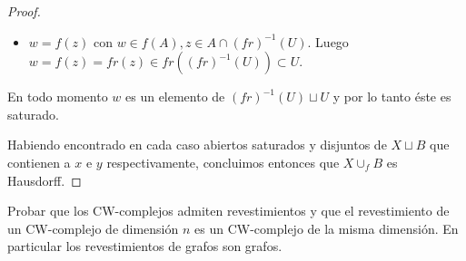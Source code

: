 \documentclass[11pt]{article}
\newcommand{\paint}[2]{\color{#1}{#2}}
\newenvironment{exercise}[2][Ejercicio]{\begin{trivlist}
\item[\hskip \labelsep \paint{grey-light-blue}{{\bfseries #1}}\hskip \labelsep {\bfseries #2.}]}{\end{trivlist}}
\begin{document}
\begin{proof}
\begin{itemize}
\begin{itemize}
\item[$\blacktriangleright$] $w = f(z)$ con $w \in f(A), z \in A \cap (fr)^{-1}(U)$. Luego $w = f(z) = fr(z) \in fr((fr)^{-1}(U)) \subset U$.
\end{itemize}
En todo momento $w$ es un elemento de $(fr)^{-1}(U) \sqcup U$ y por lo tanto \'este es saturado.
\end{itemize}
Habiendo encontrado en cada caso abiertos saturados y disjuntos de $X \sqcup B$ que contienen a $x$ e $y$ respectivamente, concluimos entonces que $X \cup_f B$ es Hausdorff. 
\end{proof}

\begin{exercise}{10} Probar que los CW-complejos admiten revestimientos y que el revestimiento de un CW-complejo de dimensi\'on $n$ es un CW-complejo de la misma dimensi\'on. En particular los revestimientos de grafos son grafos.
\end{exercise}
\end{document}
